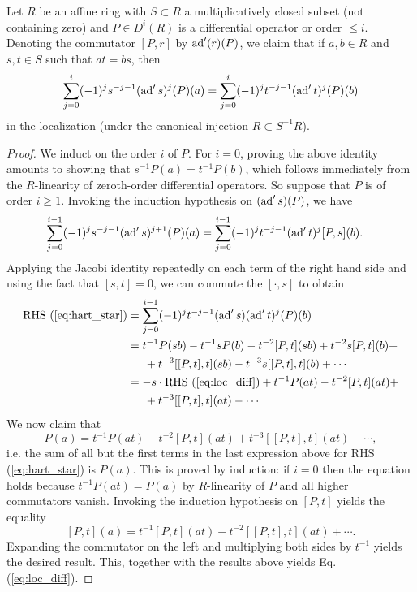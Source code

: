 \begin{lemma}
    Let $R$ be an affine ring with $S\subset R$ a multiplicatively closed subset
    (not containing zero) and $P\in D^i(R)$ is a differential operator or order
    $\leqslant i$.
    Denoting the commutator $[P,r]$ by $\operatorname{ad}'(r)(P)$, we claim that if $a,b\in R$
    and $s,t\in S$ such that $at=bs$, then 
    \begin{equation}
        \sum_{j=0}^i(-1)^js^{-j-1}(\operatorname{ad}'s)^j(P)(a) = \sum_{j=0}^i (-1)^jt^{-j-1}(\operatorname{ad}'t)^j(P)(b)
        \label{eq:loc_diff}
    \end{equation}
    in the localization (under the canonical injection $R\subset S^{-1}R$).
    \label{hart:lemma2}
\end{lemma}
\begin{proof}
    We induct on the order $i$ of $P$. For $i=0$, proving the above identity amounts to
    showing that $s^{-1}P(a)=t^{-1}P(b)$, which follows immediately from the $R$-linearity
    of zeroth-order differential operators. So suppose that $P$ is of order $i\geqslant 1$.
    Invoking the induction hypothesis on $(\operatorname{ad}'s)(P)$, we have
    \begin{align}
        \sum_{j=0}^{i-1} (-1)^js^{-j-1}(\operatorname{ad}'s)^{j+1}(P)(a) &= \sum_{j=0}^{i-1} (-1)^jt^{-j-1}(\operatorname{ad}'t)^j[P,s](b).
        \label{eq:hart_star}
    \end{align}
    Applying the Jacobi identity repeatedly on each term of the right hand side and using the
    fact that $[s,t]=0$, we can commute the $[\cdot, s]$ to obtain
    \begin{align*}
        \text{RHS (\ref{eq:hart_star})} &= \sum_{j=0}^{i-1} (-1)^jt^{-j-1}(\ad's)(\ad't)^j(P)(b)\\
        &= t^{-1}P(sb)-t^{-1}sP(b)-t^{-2}[P,t](sb)+t^{-2}s[P,t](b)+\\
        &\indent+ t^{-3}[ [P,t],t](sb) - t^{-3}s[ [P,t],t](b) + \cdots\\
        &= -s\cdot \text{RHS (\ref{eq:loc_diff})}+t^{-1}P(at)-t^{-2}[P,t](at)+\\
        &\indent+t^{-3}[ [P,t],t](at)-\cdots 
    \end{align*}
    We now claim that
    \[P(a)=t^{-1}P(at)-t^{-2}[P,t](at)+t^{-3}[ [P,t],t](at)-\cdots,\]
    i.e. the sum of all but the first terms in the last expression above for RHS (\ref{eq:hart_star})
    is $P(a)$. This is proved by induction: if $i=0$ then the equation holds because $t^{-1}P(at)=P(a)$
    by $R$-linearity of $P$ and all higher commutators vanish. Invoking the induction
    hypothesis on $[P,t]$ yields the equality
    \[ [P,t](a)=t^{-1}[P,t](at)-t^{-2}[ [P,t],t](at)+\cdots.\]
    Expanding the commutator on the left and multiplying both sides by $t^{-1}$ yields
    the desired result. This, together with the results above yields Eq. (\ref{eq:loc_diff}).
\end{proof}

